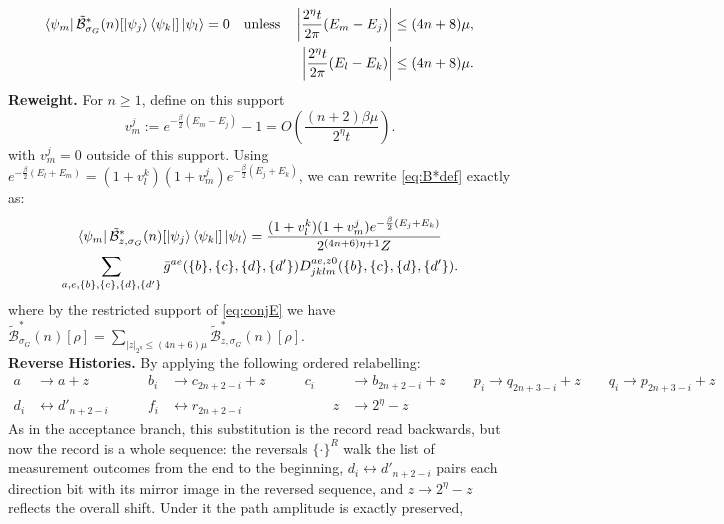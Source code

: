 \documentclass[aps,floatfix,10pt,amssymb,amsfont,amsmath,superscriptaddress,float,nofootinbib,longbibliography,nobalancelastpage,twocolumn]{revtex4-2}
\begin{document}
\begin{widetext}
\begin{equation}
\begin{aligned}
    \bra{\psi_m}\tilde{\mathcal{B}}^*_{\sigma_G}(n)[\ket{\psi_j}\bra{\psi_k}]\ket{\psi_l}=0\quad\text{unless}\quad
    \left|\frac{2^{\eta}t}{2\pi}(E_m-E_j)\right|&\leq(4n+8)\mu,\\
    \left|\frac{2^{\eta}t}{2\pi}(E_l-E_k)\right|&\leq(4n+8)\mu.
    \label{eq:Bsupport}
\end{aligned}
\end{equation}
\textbf{Reweight.} For $n\geq1$, define on this support
\begin{equation*}
    v_m^j:=e^{-\frac{\beta}{2}(E_m-E_j)}-1=O(\frac{(n+2)\beta \mu}{2^{\eta}t}).
\end{equation*}
with $v_m^j=0$ outside of this support.
Using $e^{-\frac{\beta}{2}(E_l+E_m)}=(1+v_l^k)(1+v_m^j)e^{-\frac{\beta}{2}(E_j+E_k)}$, we can rewrite \eqref{eq:B*def} exactly as:
\begin{multline}
     \bra{\psi_m}\tilde{\mathcal{B}}^*_{z,\sigma_G}(n)[\ket{\psi_j}\bra{\psi_k}]\ket{\psi_l} = \frac{(1+v_l^k)(1+v_m^j)e^{-\frac{\beta}{2}(E_j+E_k)}}{2^{(4n+6)\eta+1}Z}\\\sum_{a,e,\{b\},\{c\},\{d\},\{d'\}} \bar g^{ae}(\{b\},\{c\},\{d\},\{d'\}) D^{ae,z0}_{jklm}(\{b\},\{c\},\{d\},\{d'\}).
\end{multline}
where by the restricted support of \eqref{eq:conjE} we have $\tilde{\mathcal{B}}^*_{\sigma_G}(n)[\rho] = \sum_{|z|_{2^{\eta}}\leq (4n+6)\mu} \tilde{\mathcal{B}}^*_{z,\sigma_G}(n)[\rho]$.\\
\textbf{Reverse Histories.} By applying the following ordered relabelling:
\begin{align}
    a &\rightarrow a+ z &\qquad b_i &\rightarrow c_{2n+2-i} + z\qquad& c_i &\rightarrow b_{2n+2-i} + z  \qquad p_i \rightarrow q_{2n+3-i}+z \qquad q_i \rightarrow p_{2n+3-i} +z \label{eq:Brelabel1}\\   d_i &\leftrightarrow d'_{n+2-i} &\qquad f_i &\leftrightarrow r_{2n+2-i} &\qquad z &\rightarrow 2^{\eta} -z \label{eq:Brelabel2}
\end{align}
As in the acceptance branch, this substitution is the record read backwards, but now the record is a whole sequence: the reversals $\{\cdot\}^R$ walk the list of measurement outcomes from the end to the beginning, $d_i \leftrightarrow d'_{n+2-i}$ pairs each direction bit with its mirror image in the reversed sequence, and $z \rightarrow 2^{\eta}-z$ reflects the overall shift. Under it the path amplitude is exactly preserved,
\begin{equation}

\end{equation}
\end{widetext}
\end{document}
